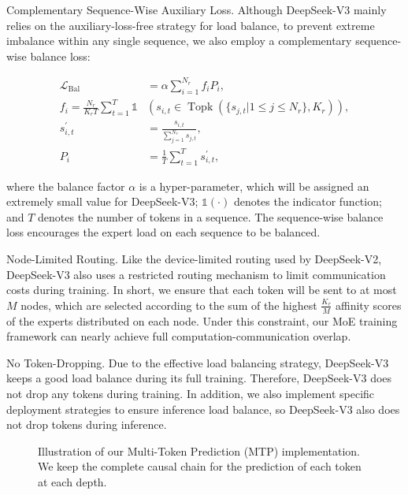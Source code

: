 \documentclass[11pt,a4paper]{article}
\begin{document}
Complementary Sequence-Wise Auxiliary Loss. Although DeepSeek-V3 mainly relies on the auxiliary-loss-free strategy for load balance, to prevent extreme imbalance within any single sequence, we also employ a complementary sequence-wise balance loss:

$$\begin{align}
    \mathcal{L}_{\mathrm{Bal}} & = \alpha \sum_{i=1}^{N_r}{f_i P_i}, \\
    f_i = \frac{N_r}{K_r T} \sum_{t=1}^{T} \mathds{1} & \left( s_{i,t} \in \operatorname{Topk} ( \{ s_{j, t} | 1 \leq j \leq N_r \}, K_{r} ) \right), \\
    s^{\prime}_{i,t} & = \frac{s_{i,t}}{\sum_{j=1}^{N_r} s_{j,t}}, \\
    P_i & = \frac{1}{T} \sum_{t=1}^{T}{s^{\prime}_{i,t}},
\end{align}$$

where the balance factor  $\alpha$  is a hyper-parameter, which will be assigned an extremely small value for DeepSeek-V3;  $\mathds{1}(\cdot)$  denotes the indicator function; and  $T$  denotes the number of tokens in a sequence. The sequence-wise balance loss encourages the expert load on each sequence to be balanced.

Node-Limited Routing. Like the device-limited routing used by DeepSeek-V2, DeepSeek-V3 also uses a restricted routing mechanism to limit communication costs during training. In short, we ensure that each token will be sent to at most  $M$  nodes, which are selected according to the sum of the highest  $\frac{K_r}{M}$  affinity scores of the experts distributed on each node. Under this constraint, our MoE training framework can nearly achieve full computation-communication overlap.

No Token-Dropping. Due to the effective load balancing strategy, DeepSeek-V3 keeps a good load balance during its full training. Therefore, DeepSeek-V3 does not drop any tokens during training. In addition, we also implement specific deployment strategies to ensure inference load balance, so DeepSeek-V3 also does not drop tokens during inference.

\begin{figure}[h]
\caption{Illustration of our Multi-Token Prediction (MTP) implementation. We keep the complete causal chain for the prediction of each token at each depth.}
\end{figure}
\end{document}
